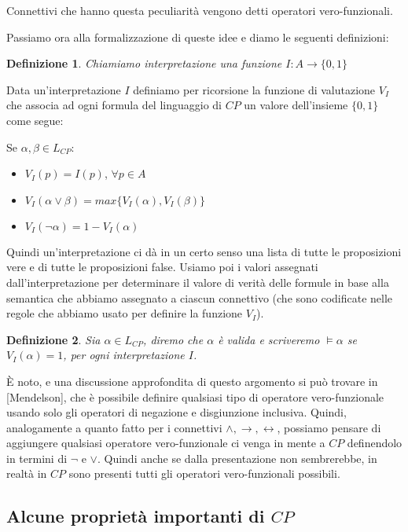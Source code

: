 \documentclass[a4paper, 12pt]{article}
\newtheorem{definition}{Definizione}
\begin{document}
Connettivi che hanno questa peculiarità vengono detti operatori vero-funzionali.

Passiamo ora alla formalizzazione di queste idee e diamo le seguenti definizioni:

\begin{definition}
Chiamiamo interpretazione una funzione $I: A \to \{0, 1\}$
\end{definition}

Data un'interpretazione $I$ definiamo per ricorsione la funzione di valutazione $V_I$ che associa ad ogni formula
del linguaggio di $CP$ un valore dell'insieme $\{0, 1\}$ come segue:

Se $\alpha, \beta \in L_{CP}$:
\begin{itemize}
\item $V_I(p) = I(p)$, $\forall p \in A$
\item $V_I(\alpha \lor \beta) = max\{V_I(\alpha), V_I(\beta)\}$
\item $V_I(\neg \alpha) = 1 - V_I(\alpha)$
\end{itemize}


Quindi un'interpretazione ci dà in un certo senso una lista di tutte le proposizioni
vere e di tutte le proposizioni false.
Usiamo poi i valori assegnati dall'interpretazione per determinare il valore di verità delle formule
in base alla semantica che abbiamo assegnato a ciascun connettivo (che sono codificate nelle regole
che abbiamo usato per definire la funzione $V_I$).

\begin{definition}
Sia $\alpha \in L_{CP}$, diremo che $\alpha$ è valida e scriveremo $\vDash \alpha$ se
$V_I(\alpha) = 1$, per ogni interpretazione $I$.
\end{definition}

È noto, e una discussione approfondita di questo argomento si può trovare in [Mendelson],
che è possibile definire qualsiasi tipo di operatore vero-funzionale usando
solo gli operatori di negazione e disgiunzione inclusiva.
Quindi, analogamente a quanto fatto per i connettivi $\land, \rightarrow, \leftrightarrow$,
possiamo pensare di aggiungere qualsiasi operatore vero-funzionale ci venga in mente
a $CP$ definendolo in termini di $\neg$ e $\lor$.
Quindi anche se dalla presentazione non sembrerebbe, in realtà in $CP$ sono presenti
tutti gli operatori vero-funzionali possibili.

\subsection{Alcune proprietà importanti di $CP$}
\end{document}
